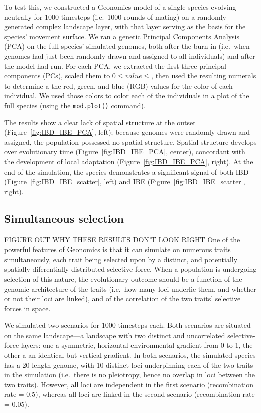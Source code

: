 ﻿\documentclass{article}
\begin{document}
To test this, we constructed a Geonomics model of a single species evolving neutrally
for 1000 timesteps (i.e.\ 1000 rounds of mating) on a randomly generated complex landscape layer,
with that layer serving as the basis for the species' movement surface.
We ran a genetic Principal Components Analysis (PCA) on the full species' simulated genomes,
both after the burn-in (i.e.\ when genomes had just been randomly drawn and assigned to all individuals)
and after the model had run. For each PCA, we extracted the first three principal components (PCs),
scaled them to $0\leq value\leq$, then used the resulting numerals to determine a the
red, green, and blue (RGB) values for the color of each individual.
We used those colors to color each of the individuals in a plot of the full species (using the \texttt{mod.plot()} command).

The results show a clear lack of spatial structure at the outset
(Figure~\ref{fig:IBD_IBE_PCA}, left);
because genomes were randomly drawn and assigned,
the population possessed no spatial structure.
Spatial structure develops over evolutionary time
(Figure~\ref{fig:IBD_IBE_PCA}, center), concordant with the development
of local adaptation (Figure~\ref{fig:IBD_IBE_PCA}, right).
At the end of the simulation, the species demonstrates a
significant signal of both IBD (Figure~\ref{fig:IBD_IBE_scatter}, left)
and IBE (Figure~\ref{fig:IBD_IBE_scatter}, right).


\subsection{Simultaneous selection}
{\large FIGURE OUT WHY THESE RESULTS DON'T LOOK RIGHT}
One of the powerful features of Geonomics is that it can simulate on numerous traits simultaneously,
each trait being selected upon by a distinct, and potentially spatially diferentially distributed selective force.
When a population is undergoing selection of this nature, the evolutionary outcome should be a function of the
genomic architecture of the traits (i.e.\ how many loci underlie them, and whether or not their loci are linked),
and of the correlation of the two traits' selective forces in space.

We simulated two scenarios for 1000 timesteps each. Both scenarios are situated on the same
landscape---a landscape with two distinct and uncorrelated selective-force layers: 
one a symmetric, horizontal environmental gradient from 0 to 1, the other a
an identical but vertical gradient.
In both scenarios, the simulated species has a 20-length genome, with 10 distinct loci underpinning
each of the two traits in the simulation (i.e.\ there is no pleiotropy, hence no overlap
in loci between the two traits). However, all loci are independent in the first scenario (recombination
rate = 0.5), whereas all loci are linked in the second scenario (recombination rate = 0.05).
\end{document}
